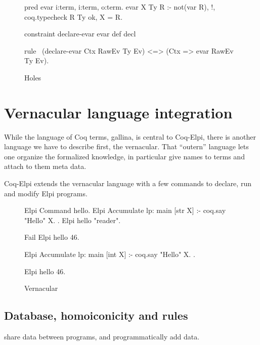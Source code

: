 \documentclass[a4paper, 11pt]{book}
\begin{document}
\begin{figure}
\begin{elpicode}
pred evar i:term, i:term, o:term. %
evar X Ty R :- not(var R), !, coq.typecheck R Ty ok, X = R.
 
constraint declare-evar evar def decl {

rule \ (declare-evar Ctx RawEv Ty Ev) <=> (Ctx => evar RawEv Ty Ev).
   
}
\end{elpicode}
\caption[holes]{Holes\label{hoas:holes}}
\end{figure}



\section{Vernacular language integration}

While the language of Coq terms, gallina, is central to Coq-Elpi, there is another
language we have to describe first, the vernacular. That ``outern'' language
lets one organize the formalized knowledge, in particular give names to terms
and attach to them meta data.

Coq-Elpi extends the vernacular language with a few commands to declare, run
and modify Elpi programs.



\begin{figure}
\begin{coqcode}
Elpi Command hello.
Elpi Accumulate lp:{{
  main [str X] :- coq.say "Hello" X.
}}.
Elpi hello "reader".

Fail Elpi hello 46.

Elpi Accumulate lp:{{
  main [int X] :- coq.say "Hello" X.
}}.

Elpi hello 46.
\end{coqcode}
\caption[Vernacular]{Vernacular\label{vernac}}
\end{figure}

\subsection{Database, homoiconicity and rules}

share data between programs, and programmatically add data.
\end{document}
